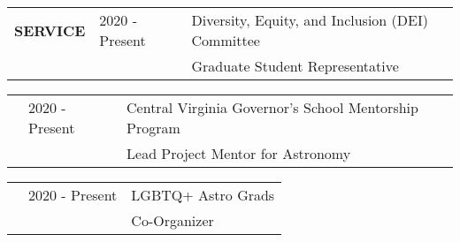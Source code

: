 \documentclass{article}
\begin{document}
\begin{tabular}{p{4cm}p{2.2cm}l}
    \large{\textbf{SERVICE}} & 2020 - Present & Diversity, Equity, and Inclusion (DEI) Committee  \\
                 & & \small Graduate Student Representative
\end{tabular}

\vspace{0.25cm}
\begin{tabular}{p{4cm}p{2.2cm}l}
    &2020 - Present& Central Virginia Governor's School Mentorship Program \\
    &             & \small Lead Project Mentor for Astronomy
\end{tabular}


\vspace{0.25cm}
\begin{tabular}{p{4cm}p{2.2cm}l}
    &2020 - Present& LGBTQ+ Astro Grads \\
    &             & \small Co-Organizer
\end{tabular}



\end{document}
